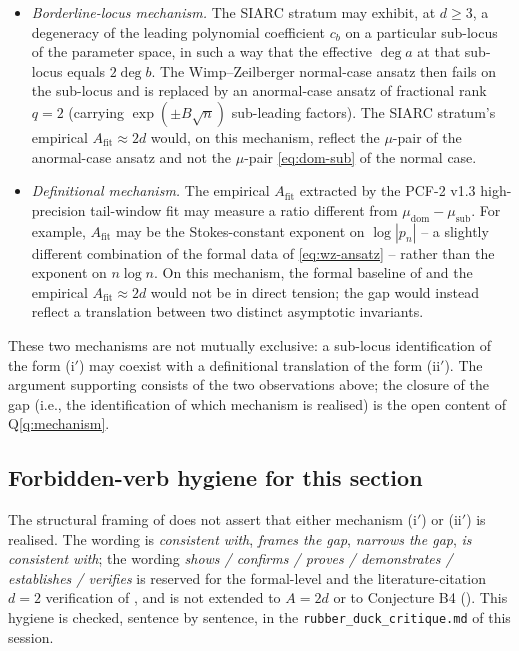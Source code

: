 \documentclass[11pt,reqno]{amsart}
\theoremstyle{plain}
\theoremstyle{definition}
\theoremstyle{remark}
\newcommand{\Afit}{A_{\mathrm{fit}}}
\newcommand{\dega}{\deg a}
\newcommand{\degb}{\deg b}
\begin{document}
\begin{itemize}[leftmargin=2.2em]
\item[\textbf{(i$'$)}] \emph{Borderline-locus mechanism.}
   The SIARC stratum may exhibit, at $d \ge 3$, a degeneracy
   of the leading polynomial coefficient $c_b$ on a particular
   sub-locus of the parameter space, in such a way that the
   effective $\dega$ at that sub-locus equals $2\degb$. The
   Wimp--Zeilberger normal-case ansatz then fails on the
   sub-locus and is replaced by an anormal-case ansatz of
   fractional rank $q = 2$ (carrying $\exp(\pm B\sqrt{n})$
   sub-leading factors). The SIARC stratum's empirical
   $\Afit \approx 2d$ would, on this mechanism, reflect the
   $\mu$-pair of the anormal-case ansatz and not the
   $\mu$-pair \eqref{eq:dom-sub} of the normal case.
\item[\textbf{(ii$'$)}] \emph{Definitional mechanism.}
   The empirical $\Afit$ extracted by the PCF-2 v1.3
   high-precision tail-window fit may measure a ratio
   different from $\mu_{\mathrm{dom}} - \mu_{\mathrm{sub}}$.
   For example, $\Afit$ may be the Stokes-constant exponent
   on $\log|p_n|$ -- a slightly different combination of the
   formal data of \eqref{eq:wz-ansatz} -- rather than the
   exponent on $n \log n$. On this mechanism, the formal
   baseline of  and the empirical
   $\Afit \approx 2d$ would not be in direct tension; the
   gap would instead reflect a translation between two
   distinct asymptotic invariants.
\end{itemize}

These two mechanisms are not mutually exclusive: a sub-locus
identification of the form (i$'$) may coexist with a
definitional translation of the form (ii$'$). The argument
supporting  consists of the two
observations above; the closure of the gap (i.e., the
identification of which mechanism is realised) is the open
content of  Q\ref{q:mechanism}.

\subsection{Forbidden-verb hygiene for this section}
\label{sec:gap-hygiene}
The structural framing of  does
not assert that either mechanism (i$'$) or (ii$'$) is
realised. The wording is \emph{consistent with}, \emph{frames
the gap}, \emph{narrows the gap}, \emph{is consistent with};
the wording \emph{shows / confirms / proves / demonstrates /
establishes / verifies} is reserved for the formal-level
 and the literature-citation
$d=2$ verification of , and is not
extended to $A = 2d$ or to Conjecture B4
(). This hygiene is checked, sentence by
sentence, in the \texttt{rubber\_duck\_critique.md} of
this session.
\end{document}
